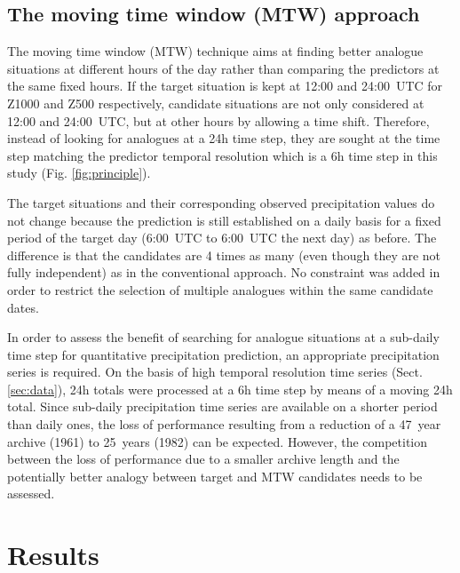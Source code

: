 \documentclass[hess, manuscript]{copernicus}
\begin{document}
	
	
	
	
	
	
	
	
	\subsection{The moving time window (MTW) approach}
	\label{sec:mtw}
	
	The moving time window (MTW) technique aims at finding better analogue situations at different hours of the day rather than comparing the predictors at the same fixed hours. If the target situation is kept at 12:00 and 24:00~UTC for Z1000 and Z500 respectively, candidate situations are not only considered at 12:00 and 24:00~UTC, but at other hours by allowing a time shift. Therefore, instead of looking for analogues at a 24h time step, they are sought at the time step matching the predictor temporal resolution which is a 6h time step in this study (Fig. \ref{fig:principle}).
	
	The target situations and their corresponding observed precipitation values do not change because the prediction is still established on a daily basis for a fixed period of the target day (6:00~UTC to 6:00~UTC the next day) as before. The difference is that the candidates are 4 times as many (even though they are not fully independent) as in the conventional approach. No constraint was added in order to restrict the selection of multiple analogues within the same candidate dates.
	
	In order to assess the benefit of searching for analogue situations at a sub-daily time step for quantitative precipitation prediction, an appropriate precipitation series is required. On the basis of high temporal resolution time series (Sect. \ref{sec:data}), 24h totals were processed at a 6h time step by means of a moving 24h total. Since sub-daily precipitation time series are available on a shorter period than daily ones, the loss of performance resulting from a reduction of a 47~year archive (1961) to 25~years (1982) can be expected. However, the competition between the loss of performance due to a smaller archive length and the potentially better analogy between target and MTW candidates needs to be assessed.
	
	
	\section{Results}
	\label{sec:results}
	
\end{document}
